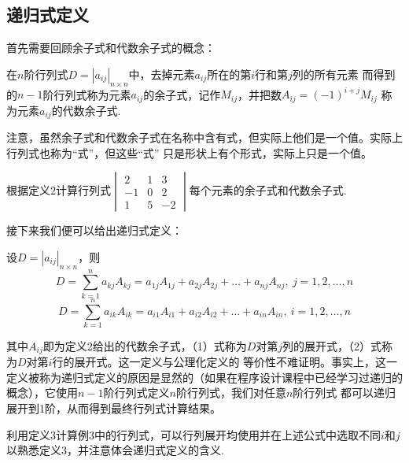 \subsection{递归式定义}
首先需要回顾余子式和代数余子式的概念：
\begin{definition}
	在$n$阶行列式$D=|a_{ij}|_{n \times n}$中，去掉元素$a_{ij}$所在的第$i$行和第$j$列的所有元素
	而得到的$n-1$阶行列式称为元素$a_{ij}$的余子式，记作$M_{ij}$，并把数$A_{ij}=(-1)^{i+j}M_{ij}$
	称为元素$a_{ij}$的代数余子式.
\end{definition}
注意，虽然余子式和代数余子式在名称中含有式，但实际上他们是一个值。实际上行列式也称为“式”，但这些“式”
只是形状上有个形式，实际上只是一个值。
\begin{example}
	根据定义$2$计算行列式$\begin{vmatrix}
		2 & 1 & 3 \\
		-1 & 0 & 2 \\
		1 & 5 & -2
	\end{vmatrix}$每个元素的余子式和代数余子式.
\end{example}

接下来我们便可以给出递归式定义：
\begin{definition}
	设$D=|a_{ij}|_{n \times n}$，则
	\begin{equation}
		D=\sum_{k=1}^{n}a_{kj}A_{kj}=a_{1j}A_{1j}+a_{2j}A_{2j}+\dots+a_{nj}A_{nj},\ j=1,2,\dots,n
	\end{equation}
	\begin{equation}
		D=\sum_{k=1}^{n}a_{ik}A_{ik}=a_{i1}A_{i1}+a_{i2}A_{i2}+\dots+a_{in}A_{in},\ i=1,2,\dots,n
	\end{equation}
\end{definition}
其中$A_{ij}$即为定义2给出的代数余子式，（1）式称为$D$对第$j$列的展开式，（2）式称为$D$对第$i$行的展开式。这一定义与公理化定义的
等价性不难证明。事实上，这一定义被称为递归式定义的原因是显然的（如果在程序设计课程中已经学习过递归的概念），它使用$n-1$阶行列式定义$n$阶行列式，我们对任意$n$阶行列式
都可以递归展开到1阶，从而得到最终行列式计算结果。
\begin{example}
	利用定义$3$计算例$3$中的行列式，可以行列展开均使用并在上述公式中选取不同$i$和$j$以熟悉定义$3$，并注意体会递归式定义的含义.
\end{example}

